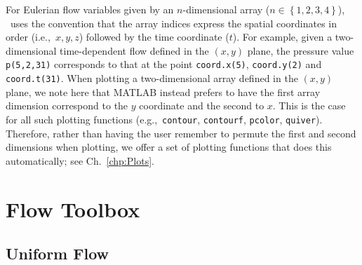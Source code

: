 \documentclass[10pt, twoside]{book}
\begin{document}
			For Eulerian flow variables given by an $n$-dimensional array ($n \in \left\lbrace 1, 2, 3, 4 \right\rbrace$), \MATfluids\ uses the convention that the array indices express the spatial coordinates in order (i.e.,~$x, y, z$) followed by the time coordinate ($t$). For example, given a two-dimensional time-dependent flow defined in the $\left(x,y\right)$ plane, the pressure value \texttt{p(5,2,31)} corresponds to that at the point \texttt{coord.x(5)}, \texttt{coord.y(2)} and \texttt{coord.t(31)}. When plotting a two-dimensional array defined in the $\left(x,y\right)$ plane, we note here that MATLAB instead prefers to have the first array dimension correspond to the $y$ coordinate and the second to $x$. This is the case for all such plotting functions (e.g.,~\texttt{contour}, \texttt{contourf}, \texttt{pcolor}, \texttt{quiver}). Therefore, rather than having the user remember to permute the first and second dimensions when plotting, we offer a set of plotting functions that does this automatically; see Ch.~\ref{chp:Plots}.
			
	\chapter{\label{chp:Flows}Flow Toolbox}
		
		\section{\label{sec:UniformFlow}Uniform Flow}
			
\end{document}
